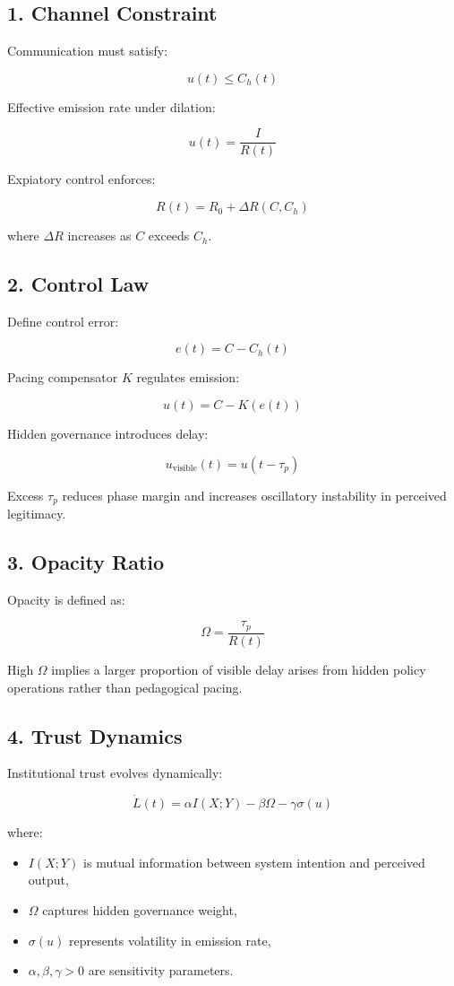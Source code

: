 \documentclass[12pt]{article}
\begin{document}
\subsection*{1. Channel Constraint}

Communication must satisfy:

\[
u(t) \le C_h(t)
\]

Effective emission rate under dilation:

\[
u(t) = \frac{I}{R(t)}
\]

Expiatory control enforces:

\[
R(t) = R_0 + \Delta R(C, C_h)
\]

where $\Delta R$ increases as $C$ exceeds $C_h$.

\subsection*{2. Control Law}

Define control error:

\[
e(t) = C - C_h(t)
\]

Pacing compensator $K$ regulates emission:

\[
u(t) = C - K(e(t))
\]

Hidden governance introduces delay:

\[
u_{\text{visible}}(t) = u(t - \tau_p)
\]

Excess $\tau_p$ reduces phase margin and increases oscillatory instability in perceived legitimacy.

\subsection*{3. Opacity Ratio}

Opacity is defined as:

\[
\Omega = \frac{\tau_p}{R(t)}
\]

High $\Omega$ implies a larger proportion of visible delay arises from hidden policy operations rather than pedagogical pacing.

\subsection*{4. Trust Dynamics}

Institutional trust evolves dynamically:

\[
\dot{L}(t) = \alpha I(X;Y) - \beta \Omega - \gamma \sigma(u)
\]

where:

\begin{itemize}
\item $I(X;Y)$ is mutual information between system intention and perceived output,
\item $\Omega$ captures hidden governance weight,
\item $\sigma(u)$ represents volatility in emission rate,
\item $\alpha, \beta, \gamma > 0$ are sensitivity parameters.
\end{itemize}
\end{document}
